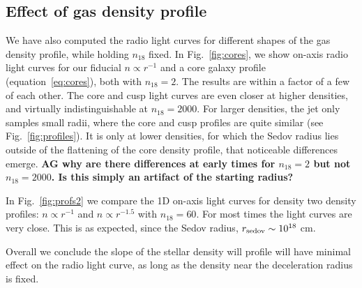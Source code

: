 \documentclass[usenatbib,fleqn]{mnras}
\begin{document}


\subsection{Effect of gas density profile}
\label{sec:profileComp}
We have also computed the radio light curves for different shapes of
the gas density profile, while holding $n_{18}$ fixed. In
Fig.~\ref{fig:cores}, we show on-axis radio light curves for our
fiducial $n\propto r^{-1}$ and a core galaxy profile
(equation~\ref{eq:cores}), both with $n_{18}=2$.
The results are within a factor of a few of each other. The core and
cusp light curves are even closer at higher densities, and virtually
indistinguishable at $n_{18}=2000$. For larger densities, the jet only
samples small radii, where the core and cusp profiles are quite
similar (see Fig.~\ref{fig:profiles}). It is only at lower densities,
for which the Sedov radius lies outside of the flattening of the core
density profile, that noticeable differences emerge. {\bf AG why are
  there differences at early times for $n_{18}=2$ but not
  $n_{18}=2000$. Is this simply an artifact of the starting radius?}

In Fig.~\ref{fig:profs2} we compare the 1D on-axis light curves for
density two density profiles: $n\propto r^{-1}$ and $n\propto r^{-1.5}$
with $n_{18}=60$. For most times the light curves are very close.
This is as expected, since the Sedov radius, $r_{\rm sedov}\sim
10^{18}$ cm. 

Overall we conclude the slope of the stellar density will profile will
have minimal effect on the radio light curve, as long as the density
near the deceleration radius is fixed. 
\end{document}
